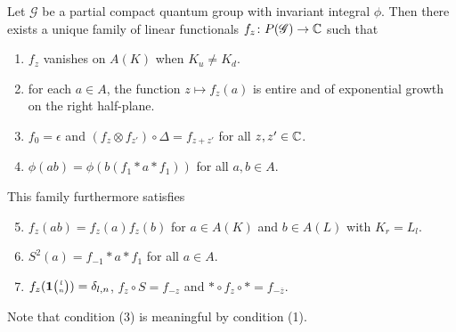 \begin{Theorem} \label{thm:rep-characters} Let $\mathscr{G}$ be a
  partial compact quantum group with invariant integral $\phi$.  Then there exists a unique
  family of linear functionals $f_{z} \colon P(\mathscr{G})\to \mathbb{C}$ such that
\begin{enumerate}
  \item $f_z$ vanishes on $A(K)$ when $K_u\neq K_d$.
  \item for each $a\in A$, the function $z\mapsto f_{z}(a)$ is entire
    and of exponential growth on the right half-plane.
  \item $f_{0} = \epsilon$ and $(f_{z} \otimes f_{z'}) \circ 
    \Delta= f_{z+z'}$ for all $z,z' \in \mathbb{C}$.
  \item $\phi(ab)=\phi(b(f_{1} \ast a \ast f_{1}))$ for all $a,b\in A$.
  \end{enumerate}
  This family furthermore satisfies
  \begin{enumerate}\setcounter{enumi}{4}
  \item $f_z(ab) = f_z(a)f_z(b)$ for $a\in A(K)$ and $b\in A(L)$ with $K_r = L_l$. 
  \item $S^{2}(a)=f_{-1} \ast a \ast f_{1}$ for all $a\in A$.
  \item $f_{z}(\mathbf{1}{\tiny {\begin{pmatrix} l\\n\end{pmatrix}}})=\delta_{l,n}$, $f_{z} \circ S = f_{-z}$   and $\ast \circ f_{z} \circ \ast= f_{-\overline{z}}$.
\end{enumerate}
\end{Theorem}


Note that condition (3) is meaningful by condition (1).


